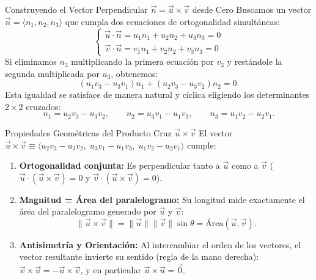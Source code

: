 \documentclass[11pt,letterpaper]{article}
\begin{document}
\begin{infobox}{Construyendo el Vector Perpendicular $\vec{n} = \vec{u} \times \vec{v}$ desde Cero}
Buscamos un vector $\vec{n} = \langle n_1, n_2, n_3 \rangle$ que cumpla dos ecuaciones de ortogonalidad simultáneas:
\[
\begin{cases}
\vec{u} \cdot \vec{n} = u_1 n_1 + u_2 n_2 + u_3 n_3 = 0 \\
\vec{v} \cdot \vec{n} = v_1 n_1 + v_2 n_2 + v_3 n_3 = 0
\end{cases}
\]
Si eliminamos $n_3$ multiplicando la primera ecuación por $v_3$ y restándole la segunda multiplicada por $u_3$, obtenemos:
\[
(u_1 v_3 - u_3 v_1) n_1 + (u_2 v_3 - u_3 v_2) n_2 = 0.
\]
Esta igualdad se satisface de manera natural y cíclica eligiendo los determinantes $2 \times 2$ cruzados:
\[
n_1 = u_2 v_3 - u_3 v_2, \qquad n_2 = u_3 v_1 - u_1 v_3, \qquad n_3 = u_1 v_2 - u_2 v_1.
\]
\end{infobox}

\begin{theorembox}{Propiedades Geométricas del Producto Cruz $\vec{u} \times \vec{v}$}
El vector $\vec{u} \times \vec{v} \equiv \langle u_2 v_3 - u_3 v_2,\; u_3 v_1 - u_1 v_3,\; u_1 v_2 - u_2 v_1 \rangle$ cumple:
\begin{enumerate}
    \item \textbf{Ortogonalidad conjunta:} Es perpendicular tanto a $\vec{u}$ como a $\vec{v}$ ($\vec{u}\cdot(\vec{u}\times\vec{v}) = 0$ y $\vec{v}\cdot(\vec{u}\times\vec{v}) = 0$).
    \item \textbf{Magnitud = Área del paralelogramo:} Su longitud mide exactamente el área del paralelogramo generado por $\vec{u}$ y $\vec{v}$:
    \[
    \|\vec{u} \times \vec{v}\| = \|\vec{u}\| \|\vec{v}\| \sin\theta = \text{Área}(\vec{u}, \vec{v}).
    \]
    \item \textbf{Antisimetría y Orientación:} Al intercambiar el orden de los vectores, el vector resultante invierte su sentido (regla de la mano derecha): $\vec{v} \times \vec{u} = -\vec{u} \times \vec{v}$, y en particular $\vec{u} \times \vec{u} = \vec{0}$.
\end{enumerate}
\end{theorembox}
\end{document}
